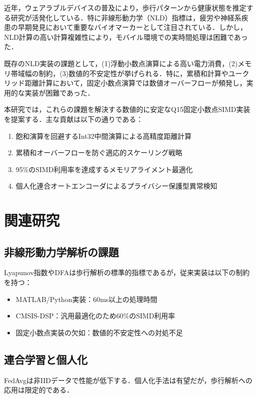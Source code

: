 \documentclass[paper]{ieice}
\begin{document}
近年，ウェアラブルデバイスの普及により，歩行パターンから健康状態を推定する研究が活発化している\cite{hausdorff2009}．特に非線形動力学（NLD）指標は，疲労や神経系疾患の早期発見において重要なバイオマーカーとして注目されている\cite{peng1995}．しかし，NLD計算の高い計算複雑性により，モバイル環境での実時間処理は困難であった．

既存のNLD実装の課題として，(1)浮動小数点演算による高い電力消費，(2)メモリ帯域幅の制約，(3)数値的不安定性が挙げられる．特に，累積和計算やユークリッド距離計算において，固定小数点演算では数値オーバーフローが頻発し，実用的な実装が困難であった．

本研究では，これらの課題を解決する数値的に安定なQ15固定小数点SIMD実装を提案する．主な貢献は以下の通りである：
\begin{enumerate}
\item 飽和演算を回避するInt32中間演算による高精度距離計算
\item 累積和オーバーフローを防ぐ適応的スケーリング戦略
\item 95\%のSIMD利用率を達成するメモリアライメント最適化
\item 個人化連合オートエンコーダによるプライバシー保護型異常検知
\end{enumerate}

\section{関連研究}

\subsection{非線形動力学解析の課題}
Lyapunov指数\cite{rosenstein1993}やDFA\cite{peng1994}は歩行解析の標準的指標であるが，従来実装は以下の制約を持つ：
\begin{itemize}
\item MATLAB/Python実装：60ms以上の処理時間
\item CMSIS-DSP\cite{arm2020}：汎用最適化のため60\%のSIMD利用率
\item 固定小数点実装の欠如：数値的不安定性への対処不足
\end{itemize}

\subsection{連合学習と個人化}
FedAvg\cite{mcmahan2017}は非IIDデータで性能が低下する．個人化手法\cite{li2020}は有望だが，歩行解析への応用は限定的である．
\end{document}
